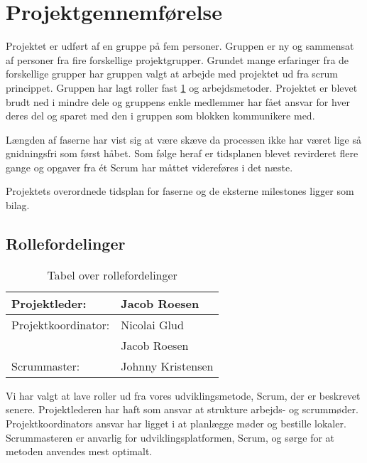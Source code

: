 \section{Projektgennemførelse}
Projektet er udført af en gruppe på fem personer. Gruppen er ny og sammensat af personer fra fire forskellige projektgrupper. Grundet mange erfaringer fra de forskellige grupper har gruppen valgt at arbejde med projektet ud fra scrum princippet. Gruppen har lagt roller fast \ref{table:roller} og arbejdsmetoder. Projektet er blevet brudt ned i mindre dele og gruppens enkle medlemmer har fået ansvar for hver deres del og sparet med den i gruppen som blokken kommunikere med.

Længden af faserne har vist sig at være skæve da processen ikke har været lige så gnidningsfri som først håbet. Som følge heraf er tidsplanen blevet revirderet flere gange og opgaver fra ét Scrum har måttet videreføres i det næste.

Projektets overordnede tidsplan for faserne og de eksterne milestones ligger som bilag.

\subsection{Rollefordelinger}
\begin{table}[H]
\centering
\begin{tabular}{|l|l|} \hline
Projektleder: &Jacob Roesen\\\hline
Projektkoordinator: &Nicolai Glud\\
	&Jacob Roesen\\\hline
Scrummaster: &Johnny Kristensen\\\hline
\end{tabular}
\caption{Tabel over rollefordelinger}
\label{table:roller}
\end{table}
Vi har valgt at lave roller ud fra vores udviklingsmetode, Scrum, der er beskrevet senere. Projektlederen har haft som ansvar at strukture arbejds- og scrummøder. Projektkoordinators ansvar har ligget i at planlægge møder og bestille lokaler. Scrummasteren er anvarlig for udviklingsplatformen, Scrum, og sørge for at metoden anvendes mest optimalt. 